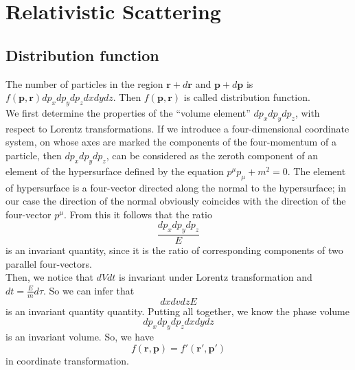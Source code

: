\section{Relativistic Scattering}
\subsection{Distribution function}
The number of particles in the region $\bm{r}+d\bm{r}$ and $\bm{p} + d\bm{p}$ is $f(\bm{p},\bm{r})dp_x dp_y dp_z dx dy dz$. Then  $f(\bm{p},\bm{r})$ is called distribution function.\\
We first determine the properties of the ``volume element'' $dp_x dp_y dp_z$, with respect to Lorentz transformations. If we introduce a four-dimensional coordinate system, on whose axes are marked the components of the four-momentum of a particle, then $dp_x dp_y dp_z$, can be considered as the zeroth component of an element of the hypersurface defined by the equation $p^{\mu}p_{\mu} + m^2 = 0$. The element of hypersurface is a four-vector directed along the normal to the hypersurface; in our case the direction of the normal obviously coincides with the direction of the four-vector $p^{\mu}$. From this it follows that the ratio
\[\frac{dp_x dp_y dp_z}{E}\]
is an invariant quantity, since it is the ratio of corresponding components of two parallel four-vectors.\\
Then, we notice that $dVdt$ is invariant under Lorentz transformation and $dt = \frac{E}{m} d\tau $. So we can infer that
\[dx dv dz E\]
is an invariant quantity quantity. Putting all together, we know the phase volume
\[dp_x dp_y dp_z dx dy dz\]
is an invariant volume. So, we have
\[f(\bm{r},\bm{p}) = f'(\bm{r}',\bm{p}')\]
in coordinate transformation.

